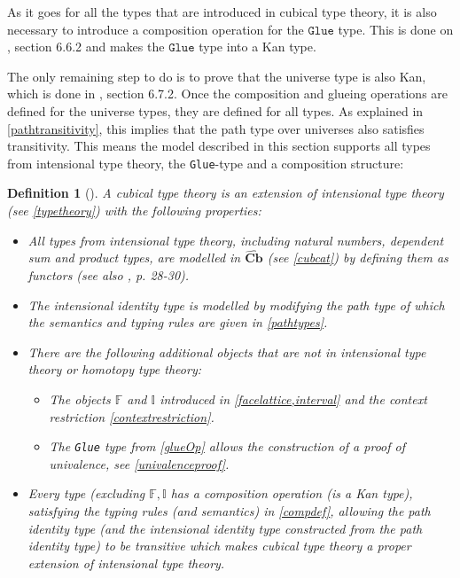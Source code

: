 \documentclass[12pt,a4paper,twoside,xetex]{book} %
\newcommand{\keyword}[1]{\emph{#1}\index{#1}}
\newtheorem{definition}[theorem]{Definition}
\newcommand{\psh}[1]{\widehat{#1}}
\newcommand{\op}[1]{\mathtt{#1}}
\newcommand{\cube}[0]{\textbf{Cb}}
\begin{document}
As it goes for all the types that are introduced in cubical type theory, it is 
also necessary to introduce a composition operation for the $\op{Glue}$ type. 
This is done on \cite{Huber2016}, section 6.6.2 and makes the $\op{Glue}$ type 
into a Kan type.

The only remaining step to do is to prove that the universe type is also Kan, 
which is done in \cite{Huber2016}, section 6.7.2. Once the composition and 
glueing operations are defined for the universe types, they are defined for all 
types. As explained in \cref{pathtransitivity}, this implies that the path type 
over universes also satisfies transitivity. This means the model described in 
this section supports all types from intensional type theory, the 
\texttt{Glue}-type and a composition structure:

\begin{definition}[\cite{Huber2016}]\label{ctt}
A \keyword{cubical type theory} is an 
extension of intensional type theory (see \cref{typetheory}) with the following 
properties:
\begin{itemize}
 \item All types from intensional type theory, including natural numbers, 
dependent sum and product types, are modelled in $\psh{\cube}$ (see \cref{cubcat}) by defining them as functors (see also \cite{Huber2016}, 
p. 28-30).
 
 \item The intensional identity type is modelled by modifying the path type of 
which the semantics and typing rules are given in \cref{pathtypes}.
 
 \item There are the following additional objects that are not in intensional 
type theory or homotopy type theory:
 
 \begin{itemize}
 \item The objects $\mathbb{F}$ and $\mathbb{I}$ introduced in 
\cref{facelattice,interval} and the context restriction 
\cref{contextrestriction}.
  \item The \texttt{Glue} type from \cref{glueOp} allows the construction of a 
proof of univalence, see \cref{univalenceproof}.
 
 \end{itemize}
 \item Every type (excluding \(\mathbb{F}, \mathbb{I}\) has a composition operation (is a Kan type), 
satisfying the typing rules (and semantics) in \cref{compdef}, allowing the path identity type (and the intensional identity type constructed from the path identity type) to be transitive which makes cubical type theory a proper 
extension of intensional type theory.
\end{itemize} 
\end{definition}
\end{document}
